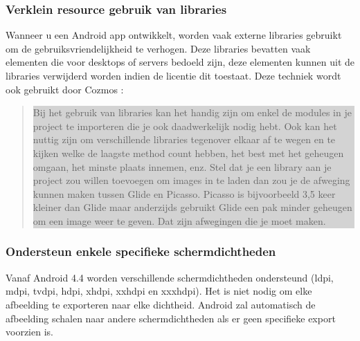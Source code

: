 \subsubsection{Verklein resource gebruik van libraries}
\label{sec:minimizeresourceslibraries}
Wanneer u een Android app ontwikkelt, worden vaak externe libraries gebruikt om de gebruiksvriendelijkheid te verhogen. Deze libraries bevatten vaak elementen die voor desktops of servers bedoeld zijn, deze elementen kunnen uit de libraries verwijderd worden indien de licentie dit toestaat. Deze techniek wordt ook gebruikt door Cozmos : 
\begin{quote}
	\colorbox{lightgray}{\parbox{350px}{Bij het gebruik van libraries kan het handig zijn om enkel de modules in je project te importeren die je ook daadwerkelijk nodig hebt. Ook kan het nuttig zijn om verschillende libraries tegenover elkaar af te wegen en te kijken welke de laagste method count hebben, het best met het geheugen omgaan, het minste plaats innemen, enz. Stel dat je een library aan je project zou willen toevoegen om images in te laden dan zou je de afweging kunnen maken tussen Glide en Picasso. Picasso is bijvoorbeeld 3,5 keer kleiner dan Glide maar anderzijds gebruikt Glide een pak minder geheugen om een image weer te geven. Dat zijn afwegingen die je moet maken.}}
\end{quote}

\subsubsection{Ondersteun enkele specifieke schermdichtheden }
\label{sec:supportspecificdensities}
Vanaf Android 4.4 worden verschillende schermdichtheden ondersteund (ldpi, mdpi, tvdpi, hdpi, xhdpi, xxhdpi en xxxhdpi). Het is niet nodig om elke afbeelding te exporteren naar elke dichtheid. Android zal automatisch de afbeelding schalen naar andere schermdichtheden als er geen specifieke export voorzien is. 

